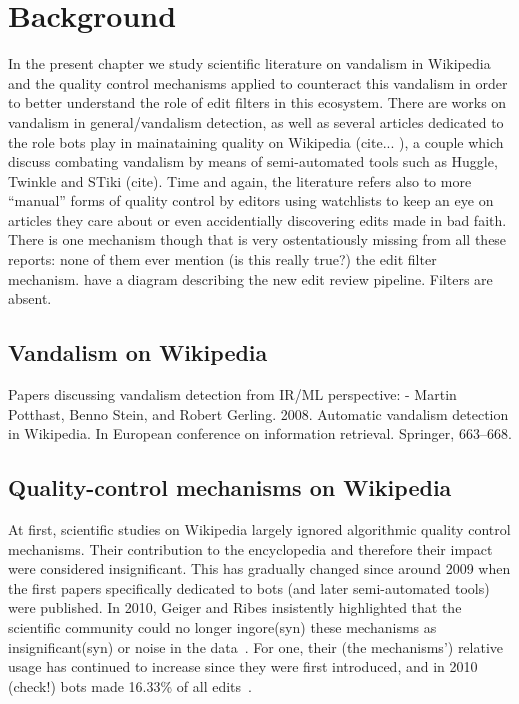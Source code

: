 \chapter{Background}
\label{chap:background}

In the present chapter we study scientific literature on vandalism in Wikipedia and the quality control mechanisms applied to counteract this vandalism in order to better understand the role of edit filters in this ecosystem.
There are works on vandalism in general/vandalism detection, as well as several articles dedicated to the role bots play in mainataining quality on Wikipedia (cite... ), a couple which discuss combating vandalism by means of semi-automated tools such as Huggle, Twinkle and STiki (cite).
Time and again, the literature refers also to more ``manual'' forms of quality control by editors using watchlists to keep an eye on articles they care about or even accidentially discovering edits made in bad faith.
There is one mechanism though that is very ostentatiously missing from all these reports: none of them ever mention (is this really true?) the edit filter mechanism.
\cite{AstHal2018} have a diagram describing the new edit review pipeline. Filters are absent.

\section{Vandalism on Wikipedia}

Papers discussing vandalism detection from IR/ML perspective:
- Martin Potthast, Benno Stein, and Robert Gerling. 2008. Automatic vandalism detection in Wikipedia. In European conference on information retrieval. Springer, 663–668.

\section{Quality-control mechanisms on Wikipedia}

At first, scientific studies on Wikipedia largely ignored algorithmic quality control mechanisms.
Their contribution to the encyclopedia and therefore their impact were considered insignificant.
This has gradually changed since around 2009 when the first papers specifically dedicated to bots (and later semi-automated tools) were published.
In 2010, Geiger and Ribes insistently highlighted that the scientific community could no longer ingore(syn) these mechanisms as insignificant(syn) or noise in the data~\cite{GeiRib2010}.
For one, their (the mechanisms') relative usage has continued to increase since they were first introduced, and in 2010 (check!) bots made 16.33\% of all edits~\cite{GeiRib2010}.

